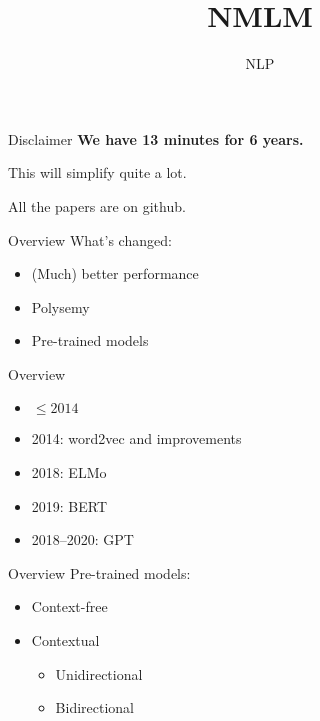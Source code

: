 \documentclass[t,aspectratio=169]{beamer}
\title
{NMLM}
\subtitle{NLP}
\begin{document}
\begin{frame}
  \titlepage
\end{frame}

\begin{frame}{Disclaimer}
  \textbf{We have 13 minutes for 6 years.}

  This will simplify quite a lot.  


  All the papers are on github.
\end{frame}

\begin{frame}{Overview}
  What's changed:
  \begin{itemize}
  \item (Much) better performance
  \item Polysemy
  \item Pre-trained models
  \end{itemize}
\end{frame}

\begin{frame}{Overview}
  \begin{itemize}
  \item $\le 2014$
  \item 2014: word2vec and improvements
  \item 2018: ELMo
  \item 2019: BERT
  \item 2018--2020: GPT
  \end{itemize}
\end{frame}

\begin{frame}{Overview}
  Pre-trained models:
  \begin{itemize}
  \item Context-free 
  \item Contextual
    \begin{itemize}
    \item Unidirectional 
    \item Bidirectional 
    \end{itemize}

  \end{itemize}
\end{frame}
\end{document}
